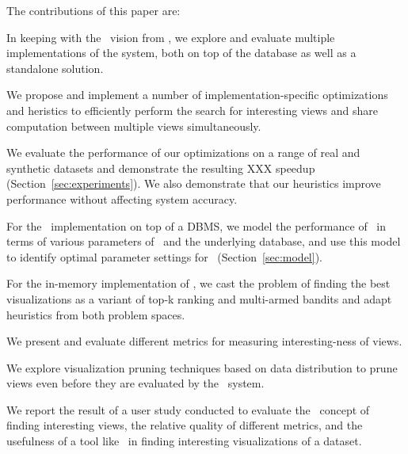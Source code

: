 The contributions of this paper are:
\squishlist
  \item In keeping with the \SeeDB\ vision from \cite{}, we explore and
  evaluate multiple implementations of the system, both on top of the database
  as well as a standalone solution.
  \item We propose and implement a number of
  implementation-specific optimizations and heristics to efficiently perform the
  search for interesting views and share computation between multiple views
  simultaneously. 
  \item We evaluate the performance of our optimizations on a range of
  real and synthetic datasets and demonstrate the resulting XXX speedup
  (Section~\ref{sec:experiments}). We also demonstrate that our heuristics
  improve performance without affecting system accuracy.
  \item For the \SeeDB\ implementation on top of a DBMS, we model the
  performance of \SeeDB\ in terms of various parameters of \SeeDB\ and the
  underlying database, and use this model to identify optimal parameter settings
  for \SeeDB\ (Section~\ref{sec:model}).
  \item For the in-memory implementation of \SeeDB, we cast the problem of
  finding the best visualizations as a variant of top-k ranking and multi-armed
  bandits and adapt heuristics from both problem spaces.
  \item We present and evaluate different metrics for measuring interesting-ness
  of views.
  \item We explore visualization pruning techniques based on data distribution
  to prune views even before they are evaluated by the \SeeDB\ system.
  \item We report the result of a user study conducted to evaluate the
  \SeeDB\ concept of finding interesting views, the relative quality of
  different metrics, and the usefulness of a tool like \SeeDB\ in finding
  interesting visualizations of a dataset.
\squishend







